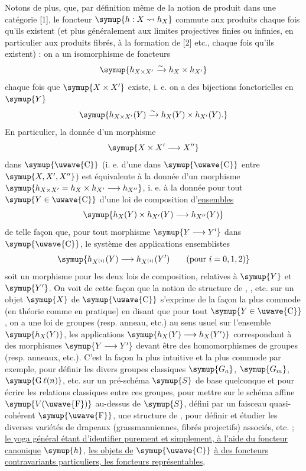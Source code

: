Notons de plus, que, par définition même de la notion de produit dans une
catégorie [1], le foncteur $\symup{h:X\rightsquigarrow h_X}$ commute aux produits chaque
fois qu'ils existent (et plus généralement aux limites projectives finies ou
infinies, en particulier aux produits fibrés, à la formation de  [2]
etc., chaque fois qu'ils existent) : on a un isomorphisme de foncteurs
\[
  \symup{h_{X\times X'}\xrightarrow{\sim}h_X\times h_{X'}}
\]
chaque fois que $\symup{X\times X'}$ existe, i. e. on a des bijections fonctorielles en
$\symup{Y}$
\[
  \symup{h_{X\times X'}(Y)\xrightarrow{\sim}h_X(Y)\times h_{X'}(Y).}
\]
En particulier, la donnée d'un morphisme
\[
  \symup{X\times X'\longrightarrow X''}
\]
dans $\symup{\text{\uwave{C}}}$ (i. e. d'une  dans $\symup{\text{\uwave{C}}}$ entre
$\symup{X,X',X''}$) est équivalente à la donnée d'un morphisme
$\symup{h_{X\times X'}=h_X\times h_{X'}\longrightarrow h_{X''}}$,
i. e. à la donnée pour tout $\symup{Y\in\text{\uwave{C}}}$ d'une loi de composition d'\uline{ensembles}
\[
  \symup{h_X(Y)\times h_{X'}(Y)\longrightarrow h_{X''}(Y)}
\]
de telle façon que, pour tout morphisme $\symup{Y\longrightarrow Y'}$ dans
$\symup{\text{\uwave{C}}}$, le système des applications ensemblistes
\[
  \symup{h_{X^{(i)}}(Y)\longrightarrow h_{X^{(i)}}(Y')
  \qquad(\text{pour }i=0,1,2)}
\]
soit un morphisme pour les deux lois de composition, relatives à $\symup{Y}$ et $\symup{Y'}$.
On voit de cette façon que la notion de structure de ,
, etc. sur un objet $\symup{X}$ de $\symup{\text{\uwave{C}}}$ s'exprime de la
façon la plus commode (en théorie comme en pratique) en disant que pour tout
$\symup{Y\in\text{\uwave{C}}}$, on a une loi de groupes (resp. anneau, etc.) au sens usuel
sur l'ensemble $\symup{h_X(Y)}$, les applications
$\symup{h_X(Y)\longrightarrow h_X(Y')}$ correspondant à des morphismes
$\symup{Y\longrightarrow Y'}$ devant être des homomorphismes de groupes (resp.
anneaux, etc.). C'est la façon la plus intuitive et la plus commode par
exemple, pour définir les divers groupes classiques $\symup{G_a}$, $\symup{G_m}$,
$\symup{\operatorname{G}\ell(n)}$, etc. sur un pré-schéma $\symup{S}$ de base quelconque et pour
écrire les relations classiques entre ces groupes, pour mettre sur le schéma
affine $\symup{V(\text{\uwave{F}})}$ au-dessus de $\symup{S}$, défini par un faisceau quasi-cohérent
$\symup{\text{\uwave{F}}}$, une structure de , pour définir et étudier les
diverses variétés de drapeaux (grassmanniennes, fibrés projectifs) associés,
etc. ; \uline{le yoga général étant d'identifier purement et simplement, à l'aide du
foncteur canonique} $\symup{h}$, \uline{les objets de} $\symup{\text{\uwave{C}}}$ \uline{à des foncteurs
contravariants particuliers, les foncteurs représentables},

